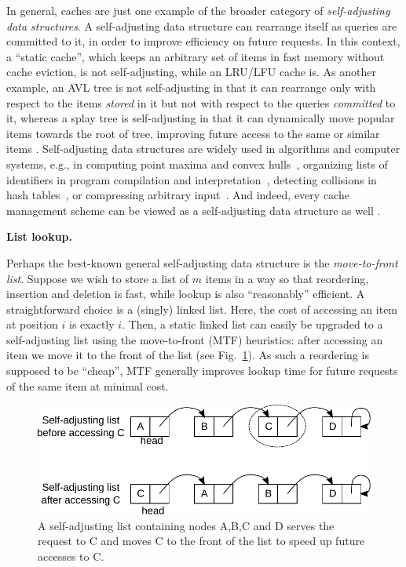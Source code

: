 In general, caches are just one example of the broader category of \emph{self-adjusting data structures}. A self-adjusting data structure can rearrange itself as queries are committed to it, in order to improve efficiency on future requests. In this context, a ``static cache'', which keeps an arbitrary set of items in fast memory without cache eviction, is not self-adjusting, while an LRU\slash LFU cache is. As another example, an AVL tree is not self-adjusting in that it can rearrange only with respect to the items \emph{stored} in it but not with respect to the queries \emph{committed} to it, whereas a splay tree is self-adjusting in that it can dynamically move popular items towards the root of tree, improving future access to the same or similar items \cite{SleatorT85Splay, BoseDL08, Avin0020}. Self-adjusting data structures are widely used in algorithms and computer systems, e.g., in computing point maxima and convex hulls~\cite{BentleyCL93}, organizing lists of identifiers in program compilation and interpretation~\cite{HesterH85}, detecting collisions in hash tables~\cite{HesterH85}, or compressing arbitrary input~\cite{BentleySTW86}. And indeed, every cache management scheme can be viewed as a self-adjusting data structure as well %
\cite{SleatorT85}.  %


\noindent%
\textbf{List lookup.} %


Perhaps the best-known general self-adjusting data structure is the \emph{move-to-front list}. Suppose we wish to store a list of $m$ items in a way so that reordering, insertion and deletion is fast, while lookup is also ``reasonably'' efficient. A straightforward choice is a (singly) linked list. Here, the cost of accessing an item at position $i$ is exactly $i$. Then, a static linked list can easily be upgraded to a self-adjusting list using the move-to-front (MTF) heuristics: after accessing an item we move it to the front of the list (see Fig.~\ref{fig:mtf-example}). As such a reordering is supposed to be ``cheap'', MTF generally improves lookup time for future requests of the same item at minimal cost.


\begin{figure}
  \centering
  \includegraphics[width=.85\linewidth]{fig/mtf.pdf}
  \caption{A self-adjusting list containing nodes A,B,C and D serves the request to C and moves C to the front of the list to speed up future accesses to C.}
  \label{fig:mtf-example}
\end{figure}

